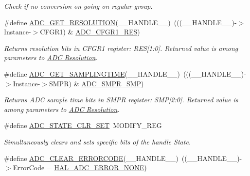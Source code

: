 \begin{DoxyCompactItemize}
\begin{DoxyCompactList}\small\item\em Check if no conversion on going on regular group. \end{DoxyCompactList}\item 
\#define \hyperlink{group___a_d_c___private___macros_gae2da95074db4dd0418c1dd1f13ad7970}{A\+D\+C\+\_\+\+G\+E\+T\+\_\+\+R\+E\+S\+O\+L\+U\+T\+I\+ON}(\+\_\+\+\_\+\+H\+A\+N\+D\+L\+E\+\_\+\+\_\+)~(((\+\_\+\+\_\+\+H\+A\+N\+D\+L\+E\+\_\+\+\_\+)-\/$>$Instance-\/$>$C\+F\+G\+R1) \& \hyperlink{group___peripheral___registers___bits___definition_ga9d5676c559f66561a86e6236ba803f98}{A\+D\+C\+\_\+\+C\+F\+G\+R1\+\_\+\+R\+ES})
\begin{DoxyCompactList}\small\item\em Returns resolution bits in C\+F\+G\+R1 register\+: R\+ES\mbox{[}1\+:0\mbox{]}. Returned value is among parameters to \hyperlink{group___a_d_c___resolution}{A\+DC Resolution}. \end{DoxyCompactList}\item 
\#define \hyperlink{group___a_d_c___private___macros_ga2fcb55eda590a2037a99af8d594460b7}{A\+D\+C\+\_\+\+G\+E\+T\+\_\+\+S\+A\+M\+P\+L\+I\+N\+G\+T\+I\+ME}(\+\_\+\+\_\+\+H\+A\+N\+D\+L\+E\+\_\+\+\_\+)~(((\+\_\+\+\_\+\+H\+A\+N\+D\+L\+E\+\_\+\+\_\+)-\/$>$Instance-\/$>$S\+M\+PR) \& \hyperlink{group___peripheral___registers___bits___definition_gaceac2124a2a41388f9f5e5c2c310a27e}{A\+D\+C\+\_\+\+S\+M\+P\+R\+\_\+\+S\+MP})
\begin{DoxyCompactList}\small\item\em Returns A\+DC sample time bits in S\+M\+PR register\+: S\+MP\mbox{[}2\+:0\mbox{]}. Returned value is among parameters to \hyperlink{group___a_d_c___resolution}{A\+DC Resolution}. \end{DoxyCompactList}\item 
\#define \hyperlink{group___a_d_c___private___macros_gaaf93e91b164d4a220aae475eff82665f}{A\+D\+C\+\_\+\+S\+T\+A\+T\+E\+\_\+\+C\+L\+R\+\_\+\+S\+ET}~M\+O\+D\+I\+F\+Y\+\_\+\+R\+EG
\begin{DoxyCompactList}\small\item\em Simultaneously clears and sets specific bits of the handle State. \end{DoxyCompactList}\item 
\#define \hyperlink{group___a_d_c___private___macros_gac7ab87a3ab932eed1b3ac5faad4e3aa9}{A\+D\+C\+\_\+\+C\+L\+E\+A\+R\+\_\+\+E\+R\+R\+O\+R\+C\+O\+DE}(\+\_\+\+\_\+\+H\+A\+N\+D\+L\+E\+\_\+\+\_\+)~((\+\_\+\+\_\+\+H\+A\+N\+D\+L\+E\+\_\+\+\_\+)-\/$>$Error\+Code = \hyperlink{group___a_d_c___error___code_ga93b4576d46ee0f8c53b7d69f39778e38}{H\+A\+L\+\_\+\+A\+D\+C\+\_\+\+E\+R\+R\+O\+R\+\_\+\+N\+O\+NE})

\end{DoxyCompactItemize}
